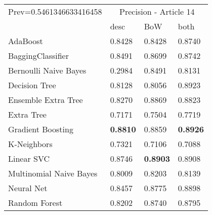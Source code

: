 \begin{tabular}{|l|l|l|l| }
\hline
Prev=0.5461346633416458 &  \multicolumn{3}{c|}{Precision - Article 14} \\
\cline{2-4} & desc & BoW & both \\ \hline
AdaBoost                & 0.8428 & 0.8428 & 0.8740\\
BaggingClassifier       & 0.8491 & 0.8699 & 0.8742\\
Bernoulli Naive Bayes   & 0.2984 & 0.8491 & 0.8131\\
Decision Tree           & 0.8128 & 0.8056 & 0.8923\\
Ensemble Extra Tree     & 0.8270 & 0.8869 & 0.8823\\
Extra Tree              & 0.7171 & 0.7504 & 0.7719\\
Gradient Boosting       & {\bf 0.8810} & 0.8859 & {\bf 0.8926}\\
K-Neighbors             & 0.7321 & 0.7106 & 0.7088\\
Linear SVC              & 0.8746 & {\bf 0.8903} & 0.8908\\
Multinomial Naive Bayes & 0.8009 & 0.8203 & 0.8139\\
Neural Net              & 0.8457 & 0.8775 & 0.8898\\
Random Forest           & 0.8202 & 0.8740 & 0.8795\\
\hline
\end{tabular}